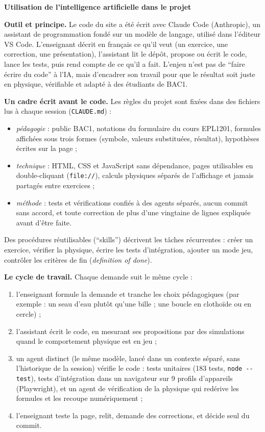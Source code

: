 \documentclass[10pt, a4paper]{article}
\begin{document}
{\Large\bfseries Utilisation de l'intelligence artificielle dans le projet\par}
\vspace{0.4em}

\textbf{Outil et principe.} Le code du site a été écrit avec Claude Code
(Anthropic), un assistant de programmation fondé sur un modèle de langage,
utilisé dans l'éditeur VS Code. L'enseignant décrit en français ce qu'il veut
(un exercice, une correction, une présentation), l'assistant lit le dépôt,
propose ou écrit le code, lance les tests, puis rend compte de ce qu'il a fait.
L'enjeu n'est pas de \enquote{faire écrire du code} à l'IA, mais d'encadrer son
travail pour que le résultat soit juste en physique, vérifiable et adapté à des
étudiants de BAC1.

\textbf{Un cadre écrit avant le code.} Les règles du projet sont fixées dans
des fichiers lus à chaque session (\texttt{CLAUDE.md}) :
\begin{itemize}
  \item \emph{pédagogie} : public BAC1, notations du formulaire du cours
        EPL1201, formules affichées sous trois formes (symbole, valeurs
        substituées, résultat), hypothèses écrites sur la page ;
  \item \emph{technique} : HTML, CSS et JavaScript sans dépendance, pages
        utilisables en double-cliquant (\texttt{file://}), calculs physiques
        séparés de l'affichage et jamais partagés entre exercices ;
  \item \emph{méthode} : tests et vérifications confiés à des agents séparés,
        aucun commit sans accord, et toute correction de plus d'une vingtaine
        de lignes expliquée avant d'être faite.
\end{itemize}
Des procédures réutilisables (\enquote{skills}) décrivent les tâches
récurrentes : créer un exercice, vérifier la physique, écrire les tests
d'intégration, ajouter un mode jeu, contrôler les critères de fin
(\emph{definition of done}).

\textbf{Le cycle de travail.} Chaque demande suit le même cycle :
\begin{enumerate}
  \item l'enseignant formule la demande et tranche les choix pédagogiques (par
        exemple : un seau d'eau plutôt qu'une bille ; une boucle en clothoïde
        ou en cercle) ;
  \item l'assistant écrit le code, en mesurant ses propositions par des
        simulations quand le comportement physique est en jeu ;
  \item un agent distinct (le même modèle, lancé dans un contexte séparé, sans
        l'historique de la session) vérifie le code :
        tests unitaires (183 tests, \texttt{node -{}-test}), tests d'intégration
        dans un navigateur sur 9 profils d'appareils (Playwright), et un agent
        de vérification de la physique qui redérive les formules et les
        recoupe numériquement ;
  \item l'enseignant teste la page, relit, demande des corrections, et décide
        seul du commit.
\end{enumerate}
\end{document}
